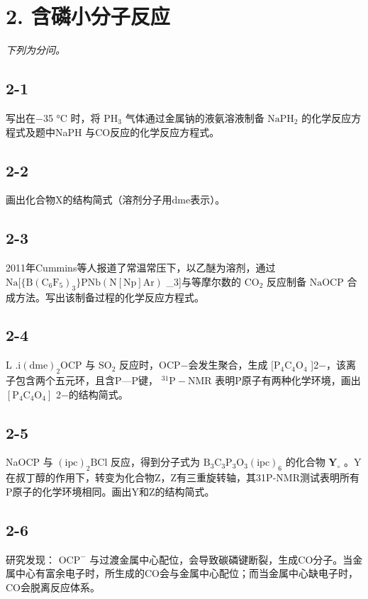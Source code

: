 \section*{2. 含磷小分子反应}
\textit{下列为分问。}

\subsection*{2-1}
写出在−35 °C 时，将 $\mathrm { P H } _ { 3 }$ ⽓体通过⾦属钠的液氨溶液制备 $\mathrm { N a P H _ { 2 } }$ 的化学反应⽅程式及题中NaPH 与CO反应的化学反应⽅程式。

\subsection*{2-2}
画出化合物X的结构简式（溶剂分⼦⽤dme表⽰）。

\subsection*{2-3}
2011年Cummins等⼈报道了常温常压下，以⼄醚为溶剂，通过 $\mathrm { N a [ \{ B ( C _ { 6 } F _ { 5 } ) _ { 3 } \} P N b ( N [ N p ] A r ) }$ _{3}]与等摩尔数的 $\mathrm { C O _ { 2 } }$ 反应制备 $\mathrm { N a O C P }$ 合成⽅法。写出该制备过程的化学反应⽅程式。

\subsection*{2-4}
L $\mathrm { . i ( d m e ) _ { 2 } O C P }$ 与 $\mathrm { S O _ { 2 } }$ 反应时，OCP−会发⽣聚合，⽣成 $\mathrm { [ P _ { 4 } C _ { 4 } O _ { 4 } }$ ]2−，该离⼦包含两个五元环，且含P—P键， $\mathrm { ^ { 3 1 } P - N M R }$ 表明P原⼦有两种化学环境，画出 $\mathrm { [ P _ { 4 } C _ { 4 } O _ { 4 } ] }$ 2−的结构简式。

\subsection*{2-5}
NaOCP 与 $( \mathrm { i p c } ) _ { 2 } \mathrm { B C l }$ 反应，得到分⼦式为 $\mathrm { B _ { 3 } C _ { 3 } P _ { 3 } O _ { 3 } ( i p c ) _ { 6 } }$ 的化合物 $\mathbf { Y } _ { \circ }$ 。Y在叔丁醇的作⽤下，转变为化合物Z，Z有三重旋转轴，其31P-NMR测试表明所有P原⼦的化学环境相同。画出Y和Z的结构简式。

\subsection*{2-6}
研究发现： $\mathrm { O C P ^ { - } }$ 与过渡⾦属中⼼配位，会导致碳磷键断裂，⽣成CO分⼦。当⾦属中⼼有富余电⼦时，所⽣成的CO会与⾦属中⼼配位；⽽当⾦属中⼼缺电⼦时，CO会脱离反应体系。

